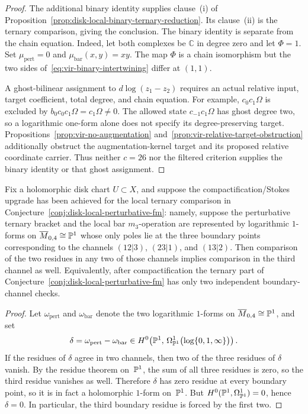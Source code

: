 \begin{proof}
The additional binary identity supplies clause~(i) of Proposition~\ref{prop:disk-local-binary-ternary-reduction}.
Its clause~(ii) is the ternary comparison, giving the conclusion.
The binary identity is separate from the chain equation.
Indeed, let both complexes be $\mathbb C$ in degree zero and let $\Phi=1$.
Set $\mu_{\mathrm{pert}}=0$ and $\mu_{\mathrm{bar}}(x,y)=xy$.
The map $\Phi$ is a chain isomorphism but the two sides of~\eqref{eq:vir-binary-intertwining} differ at $(1,1)$.

A ghost-bilinear assignment to $d\log(z_1-z_2)$ requires an actual relative input, target coefficient, total degree, and chain equation.
For example, $c_0c_1\Omega$ is excluded by $b_0c_0c_1\Omega=c_1\Omega\neq0$.
The allowed state $c_{-1}c_1\Omega$ has ghost degree two, so a logarithmic one-form alone does not specify its degree-preserving target.
Propositions~\ref{prop:vir-no-augmentation} and~\ref{prop:vir-relative-target-obstruction} additionally obstruct the augmentation-kernel target and its proposed relative coordinate carrier.
Thus neither $c=26$ nor the filtered criterion supplies the binary identity or that ghost assignment.
\end{proof}

\begin{proposition}
\label{prop:compactified-ternary-two-channel}
Fix a holomorphic disk chart $U \subset X$, and suppose the
compactification/Stokes upgrade has been achieved for the local ternary
comparison in
Conjecture~\ref{conj:disk-local-perturbative-fm}: namely, suppose the
perturbative ternary bracket and the local bar
$m_3$-operation are represented by logarithmic $1$-forms on
$\overline{M}_{0,4} \cong \mathbb{P}^1$ whose only poles lie at the three
boundary points corresponding to the channels
$(12|3)$, $(23|1)$, and $(13|2)$.
Then comparison of the two residues in any two of those channels
implies comparison in the third channel as well.
Equivalently, after compactification the ternary part of
Conjecture~\ref{conj:disk-local-perturbative-fm} has only two
independent boundary-channel checks.
\end{proposition}

\begin{proof}
Let $\omega_{\mathrm{pert}}$ and $\omega_{\mathrm{bar}}$ denote the two
logarithmic $1$-forms on $\overline{M}_{0,4} \cong \mathbb{P}^1$, and set
\[
\delta = \omega_{\mathrm{pert}} - \omega_{\mathrm{bar}}
\in H^0\!\left(\mathbb{P}^1,\,
\Omega^1_{\mathbb{P}^1}\bigl(\log\{0,1,\infty\}\bigr)\right).
\]
If the residues of $\delta$ agree in two channels, then two of the
three residues of $\delta$ vanish.  By the residue theorem on~$\mathbb{P}^1$,
the sum of all three residues is zero, so the third residue vanishes as
well.  Therefore $\delta$ has zero residue at every boundary point, so
it is in fact a holomorphic $1$-form on~$\mathbb{P}^1$.  But
$H^0(\mathbb{P}^1,\Omega^1_{\mathbb{P}^1}) = 0$, hence $\delta = 0$.
In particular, the third boundary residue is forced by the first two.
\end{proof}

